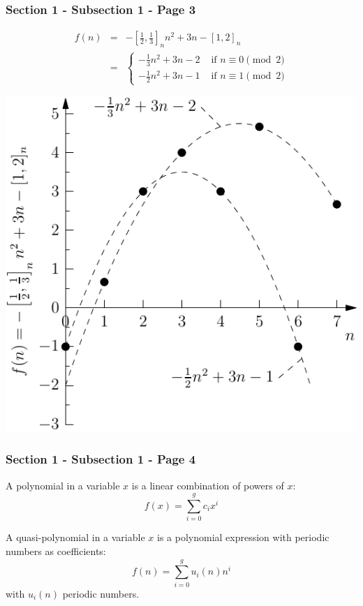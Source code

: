\documentclass{beamer}
\begin{document}
\begin{frame}\frametitle{Section 1 - Subsection 1 - Page 3}
	\begin{example}
		\centering
		{
		$$
		\begin{array}{rcl}
			f(n)
			&=&
			-\left[\frac{1}{2},\frac{1}{3}\right]_n n^2
			+3n-[1,2]_n
			\\
			&=&
			\begin{cases}
				-\frac{1}{3} n^2 +3n-2
				& \text{ if $n\equiv 0 \pmod 2$} \\
				-\frac{1}{2} n^2 +3n-1
				& \text{ if $n\equiv 1 \pmod 2$}
			\end{cases}
		\end{array}
		$$
		\begin{minipage}{0.4\textwidth}
			\includegraphics[width=\textwidth]{images/ex2_quasi_polynomial.pdf}
		\end{minipage}
		}
	\end{example}
\end{frame}

\begin{frame}\frametitle{Section 1 - Subsection 1 - Page 4}
	\begin{definition}
		A polynomial in a variable $x$ is a linear combination of powers of $x$:
		$$
		f(x)=\sum_{i=0}^g c_i x^i
		$$
	\end{definition}
	\pause
	
	\begin{definition}
		A quasi-polynomial in a variable $x$ is a polynomial expression with periodic numbers as coefficients:
		$$
		f(n)=\sum_{i=0}^g u_i(n) n^i
		$$
		with $u_i(n)$ periodic numbers.
	\end{definition}
\end{frame}
\end{document}

